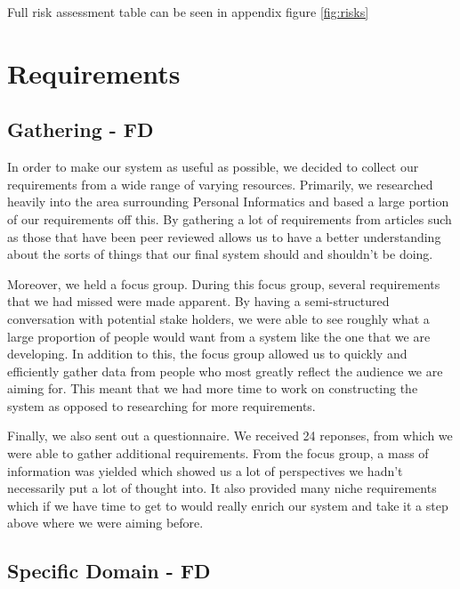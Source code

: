 \documentclass[10pt, notitlepage]{report}
\begin{document}
Full risk assessment table can be seen in appendix figure \ref{fig:risks}

\chapter{Requirements}

\section{Gathering - FD}

In order to make our system as useful as possible, we decided to collect our requirements from a wide range of varying resources. Primarily, we researched heavily into the area surrounding Personal Informatics and based a large portion of our requirements off this. By gathering a lot of requirements from articles such as those that have been peer reviewed allows us to have a better understanding about the sorts of things that our final system should and shouldn’t be doing.

Moreover, we held a focus group. During this focus group, several requirements that we had missed were made apparent. By having a semi-structured conversation with potential stake holders, we were able to see roughly what a large proportion of people would want from a system like the one that we are developing. In addition to this, the focus group allowed us to quickly and efficiently gather data from people who most greatly reflect the audience we are aiming for. This meant that we had more time to work on constructing the system as opposed to researching for more requirements.

Finally, we also sent out a questionnaire. We received 24 reponses, from which we were able to gather additional requirements. From the focus group, a mass of information was yielded which showed us a lot of perspectives we hadn’t necessarily put a lot of thought into. It also provided many niche requirements which if we have time to get to would really enrich our system and take it a step above where we were aiming before.

\section{Specific Domain -  FD}
\end{document}
